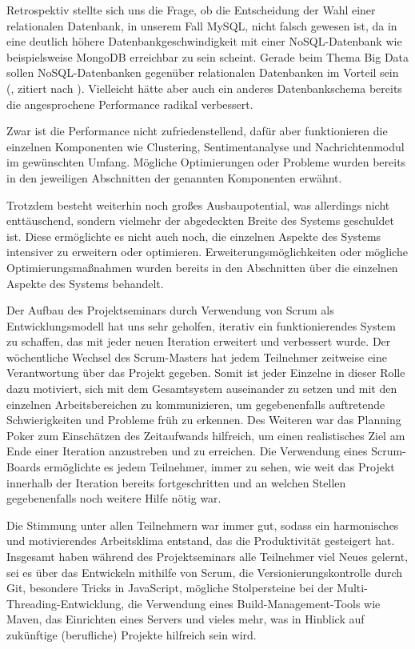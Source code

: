Retrospektiv stellte sich uns die Frage, ob die Entscheidung der Wahl einer relationalen Datenbank, in unserem Fall MySQL, nicht falsch gewesen ist, da in \cite[S.~24]{twitter_data_analytics} eine deutlich höhere Datenbankgeschwindigkeit mit einer NoSQL-Datenbank wie beispielsweise MongoDB \cite{mongodb} erreichbar zu sein scheint. Gerade beim Thema Big Data sollen NoSQL-Datenbanken gegenüber relationalen Datenbanken im Vorteil sein (\cite{seven_databases}, zitiert nach \cite[S.~23]{twitter_data_analytics}).
Vielleicht hätte aber auch ein anderes Datenbankschema bereits die angesprochene Performance radikal verbessert.

Zwar ist die Performance nicht zufriedenstellend, dafür aber funktionieren die einzelnen Komponenten wie Clustering, Sentimentanalyse und Nachrichtenmodul im gewünschten Umfang. Mögliche Optimierungen oder Probleme wurden bereits in den jeweiligen Abschnitten der genannten Komponenten erwähnt.

Trotzdem besteht weiterhin noch großes Ausbaupotential, was allerdings nicht enttäuschend, sondern vielmehr der abgedeckten Breite des Systems geschuldet ist.
Diese ermöglichte es nicht auch noch, die einzelnen Aspekte des Systems intensiver zu erweitern oder optimieren. Erweiterungsmöglichkeiten oder mögliche Optimierungsmaßnahmen wurden bereits in den Abschnitten über die einzelnen Aspekte des Systems behandelt.

Der Aufbau des Projektseminars durch Verwendung von Scrum als Entwicklungsmodell hat uns sehr geholfen, iterativ ein funktionierendes System zu schaffen, das mit jeder neuen Iteration erweitert und verbessert wurde.
Der wöchentliche Wechsel des Scrum-Masters hat jedem Teilnehmer zeitweise eine Verantwortung über das Projekt gegeben.
Somit ist jeder Einzelne in dieser Rolle dazu motiviert, sich mit dem Gesamtsystem auseinander zu setzen und mit den einzelnen Arbeitsbereichen zu kommunizieren, um gegebenenfalls auftretende Schwierigkeiten und Probleme früh zu erkennen.
Des Weiteren war das Planning Poker zum Einschätzen des Zeitaufwands hilfreich, um einen realistisches Ziel am Ende einer Iteration anzustreben und zu erreichen.
Die Verwendung eines Scrum-Boards ermöglichte es jedem Teilnehmer, immer zu sehen, wie weit das Projekt innerhalb der Iteration bereits fortgeschritten und an welchen Stellen gegebenenfalls noch weitere Hilfe nötig war.

Die Stimmung unter allen Teilnehmern war immer gut, sodass ein harmonisches und motivierendes Arbeitsklima entstand, das die Produktivität gesteigert hat.
Insgesamt haben während des Projektseminars alle Teilnehmer viel Neues gelernt, sei es über das Entwickeln mithilfe von Scrum, die Versionierungskontrolle durch Git, besondere Tricks in JavaScript, mögliche Stolpersteine bei der Multi-Threading-Entwicklung, die Verwendung eines Build-Management-Tools wie Maven, das Einrichten eines Servers und vieles mehr, was in Hinblick auf zukünftige (berufliche) Projekte hilfreich sein wird.
